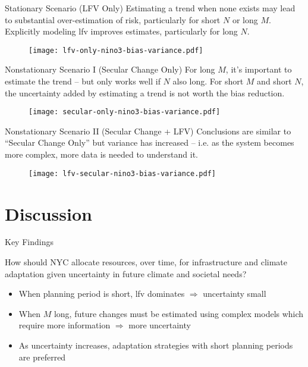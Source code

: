 \documentclass[
  10pt,     %
]{beamer}
\makeatletter
\newcommand*{\ie}{i.e.\@\xspace}
\makeatother
\begin{document}
\begin{frame}{Stationary Scenario (LFV Only)}
  Estimating a trend when none exists may lead to substantial over-estimation of risk, particularly for short $N$ or long $M$.
  Explicitly modeling \gls{lfv} improves estimates, particularly for long $N$.
  \begin{figure}
    \centering
    \texttt{[image: lfv-only-nino3-bias-variance.pdf]}
  \end{figure}
\end{frame}

\begin{frame}{Nonstationary Scenario I (Secular Change Only)}
  For long $M$, it's important to estimate the trend -- but only works well if $N$ also long.
  For short $M$ and short $N$, the uncertainty added by estimating a trend is not worth the bias reduction.
  \begin{figure}
    \centering
    \texttt{[image: secular-only-nino3-bias-variance.pdf]}
  \end{figure}
\end{frame}

\begin{frame}{Nonstationary Scenario II (Secular Change + LFV)}
  Conclusions are similar to ``Secular Change Only'' but variance has increased -- \ie as the system becomes more complex, more data is needed to understand it.
  \begin{figure}
    \centering
    \texttt{[image: lfv-secular-nino3-bias-variance.pdf]}
  \end{figure}
\end{frame}

\section{Discussion}

\begin{frame}{Key Findings}
  \begin{alertblock}{How should NYC allocate resources, over time,}
    for infrastructure and climate adaptation given uncertainty in future climate and societal needs?
  \end{alertblock}
  \begin{itemize}
    \pause
    \item When planning period is short, \gls{lfv} dominates \citep{Hodgkins:2017hw} $\Rightarrow$ uncertainty small
    \pause
    \item When $M$ long, future changes must be estimated using complex models which require more information $\Rightarrow$ more uncertainty
    \pause
    \item As uncertainty increases, adaptation strategies with short planning periods are preferred
  \end{itemize}
\end{frame}
\end{document}
